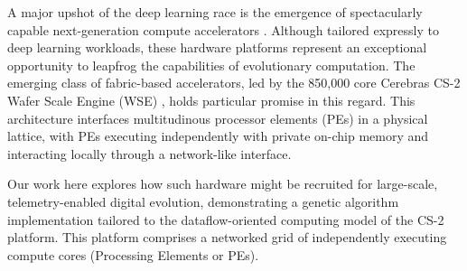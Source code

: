 A major upshot of the deep learning race is the emergence of spectacularly capable next-generation compute accelerators \citep{zhang2016cambricon,emani2021accelerating,jia2019dissecting,medina2020habana}.
Although tailored expressly to deep learning workloads, these hardware platforms represent an exceptional opportunity to leapfrog the capabilities of evolutionary computation.
The emerging class of fabric-based accelerators, led by the 850,000 core Cerebras CS-2 Wafer Scale Engine (WSE) \citep{lauterbach2021path}, holds particular promise in this regard.
This architecture interfaces multitudinous processor elements (PEs) in a physical lattice, with PEs executing independently with private on-chip memory and interacting locally through a network-like interface.

Our work here explores how such hardware might be recruited for large-scale, telemetry-enabled digital evolution, demonstrating a genetic algorithm implementation tailored to the dataflow-oriented computing model of the CS-2 platform.
This platform comprises a networked grid of independently executing compute cores (Processing Elements or PEs).





